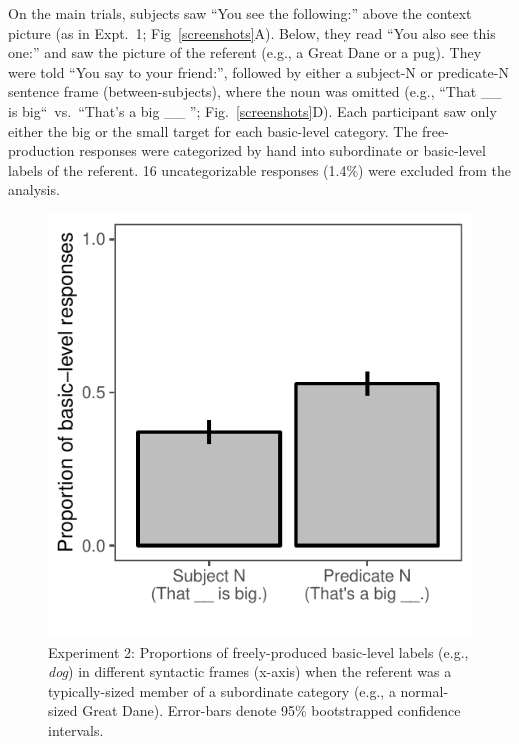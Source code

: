 \documentclass[10pt,letterpaper]{article}
\begin{document}
On the main trials, subjects saw “You see the following:” above the context picture (as in Expt.~1; Fig~\ref{screenshots}A). Below, they read “You also see this one:” and saw the picture of the referent (e.g., a Great Dane or a pug). They were told “You say to your friend:”, followed by either a subject-N or predicate-N sentence frame (between-subjects), where the noun was omitted (e.g., “That \_\_ is big“~vs.~“That’s a big \_\_ ''; Fig.~\ref{screenshots}D). Each participant saw only either the big or the small target for each basic-level category. 
The free-production responses were categorized by hand into subordinate or basic-level labels of the referent. 16 uncategorizable responses (1.4\%) were excluded from the analysis.
\begin{figure}[t]
\begin{center}
\includegraphics[width=0.7\linewidth]{expt-np-prod-prereg-bars-revised.pdf}
\end{center}
\caption{Experiment 2: Proportions of freely-produced basic-level labels (e.g., \emph{dog}) in different syntactic frames (x-axis) when the referent was a typically-sized member of a subordinate category (e.g., a normal-sized Great Dane). Error-bars denote 95\% bootstrapped confidence intervals.}
\label{np-production}
\end{figure}
\end{document}

